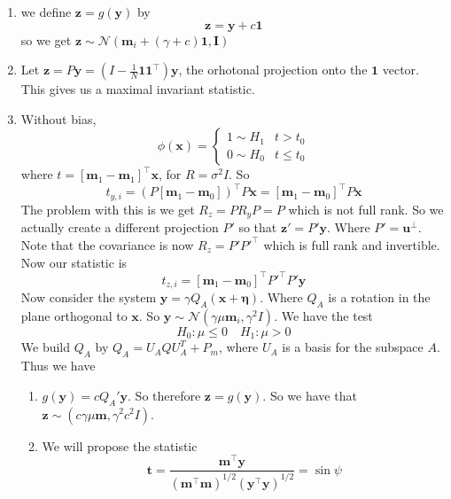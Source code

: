 \documentclass[a4paper]{article}
\begin{document}
\begin{enumerate}
  \item we define $\bm{z} = g(\bm{y})$ by
    \[
      \bm{z} = \bm{y} + c \bm{1}
    \]
    so we get $\bm{z} \sim \mathcal{N}( \bm{m}_i + (\gamma + c)\bm{1}, \bm{I})$
  \item Let $\bm{z} = P\bm{y} = (I - \frac{1}{N} \bm{1}\bm{1}^\top)\bm{y}$, the orhotonal projection onto the $\bm{1}$ vector. This gives us a maximal invariant statistic.
  \item Without bias, 
    \[
      \phi(\bm{x}) = 
      \begin{cases}
        1 \sim H_1 & t > t_0 \\
        0 \sim H_0 & t \leq t_0
      \end{cases}
    \]
    where $t = [\bm{m}_1 - \bm{m}_1]^\top \bm{x}$, for $R = \sigma^2 I$. So
    \[
      t_{y,i} = \left( P[\bm{m}_1 - \bm{m}_0]\right)^\top P \bm{x} = [\bm{m}_1 - \bm{m}_0]^\top P \bm{x}
    \]
    The problem with this is we get $R_z = PR_yP = P$ which is not full rank. So we actually create a different projection $P'$ so that $\bm{z}' = P' \bm{y}$. Where $P' = \bm{u}^\perp$. Note that the covariance is now $R_z = P' P'^\top$ which is full rank and invertible. Now our statistic is
    \[
      t_{z,i} = [\bm{m}_1 - \bm{m}_0] ^\top P'^\top P' \bm{y}
    \]
    Now consider the system $\bm{y} = \gamma Q_A (\bm{x} + \bm{\eta})$. Where $Q_A$ is a rotation in the plane orthogonal to $\bm{x}$. So $\bm{y} \sim \mathcal{N} \left(\gamma \mu \bm{m}_i, \gamma^2 I  \right)$. We have the test
    \[
        H_0: \mu \leq 0 \quad H_1: \mu > 0
    \]
    We build $Q_A$ by $Q_A = U_AQU_A^T + P_m$, where $U_A$ is a basis for the subspace $A$. Thus we have
    \begin{enumerate}
      \item $g(\bm{y}) = cQ_A' \bm{y}$. So therefore $\bm{z} = g(\bm{y})$. So we have that
        $\bm{z} \sim \left(c\gamma\mu \bm{m}, \gamma^2c^2 I\right)$.
      \item We will propose the statistic 
        \[
          \bm{t} = \frac{\bm{m}^\top \bm{y}}{(\bm{m}^\top\bm{m})^{1/2}(\bm{y}^\top \bm{y})^{1/2}} = \sin \psi
        \]
    \end{enumerate}
\end{enumerate}
\end{document}
